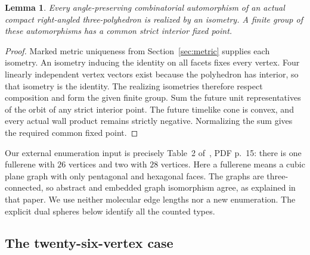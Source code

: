 \documentclass[11pt]{article}
\newtheorem{lemma}[theorem]{Lemma}
\theoremstyle{remark}
\begin{document}
\begin{lemma}\label{lem:actual-symmetry}
Every angle-preserving combinatorial automorphism of an actual compact
right-angled three-polyhedron is realized by an isometry. A finite
group of these automorphisms has a common strict interior fixed point.
\end{lemma}
\begin{proof}
Marked metric uniqueness from Section~\ref{sec:metric} supplies each
isometry. An isometry inducing the identity on all facets fixes every
vertex. Four linearly independent vertex vectors exist because the
polyhedron has interior, so that isometry is the identity. The realizing
isometries therefore respect composition and form the given finite
group. Sum the future unit representatives of the orbit of any strict
interior point. The future timelike cone is convex, and every actual
wall product remains strictly negative. Normalizing the sum gives
the required common fixed point.
\end{proof}

Our external enumeration input is precisely Table~2 of~\cite{BGM},
PDF p.~15: there is one fullerene with $26$ vertices and two with
$28$ vertices. Here a fullerene means a cubic plane graph with only
pentagonal and hexagonal faces. The graphs are three-connected, so
abstract and embedded graph isomorphism agree, as explained in that
paper. We use neither molecular edge lengths nor a new enumeration.
The explicit dual spheres below identify all the counted types.

\subsection{The twenty-six-vertex case}
\end{document}
